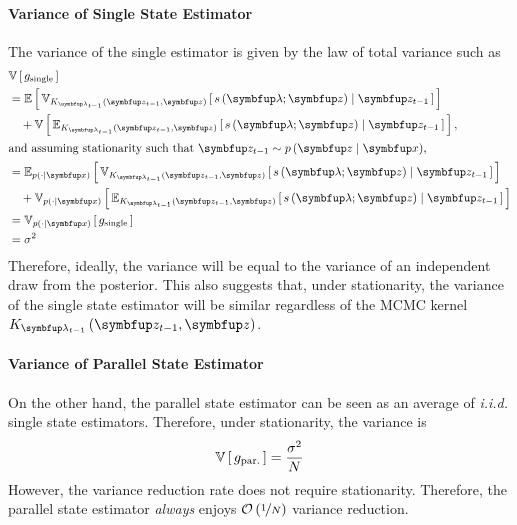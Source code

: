 \paragraph{Variance of Single State Estimator}
The variance of the single estimator is given by the law of total variance such as
\begin{align}
  &\V{g_{\text{single}}} \nonumber \\
  &= \E{ \Vsub{K_{\vlambda_{t-1}}\left(\vz_{t-1}, \vz\right)}{ s\left(\vlambda; \vz\right) \mid \vz_{t-1} }} \nonumber \\
  &\quad + \V{ \Esub{K_{\vlambda_{t-1}}\left(\vz_{t-1}, \vz\right)}{ s\left(\vlambda; \vz\right) \mid \vz_{t-1} } }, \\
  \intertext{and assuming stationarity such that \(\vz_{t-1} \sim p\left(\vz \mid \vx\right)\),}
  &= \Esub{p\left(\cdot \mid\vx \right)}{ \Vsub{K_{\vlambda_{t-1}}\left(\vz_{t-1}, \vz\right)}{ s\left(\vlambda; \vz\right) \mid \vz_{t-1} }} \nonumber\\
  &\quad + \Vsub{p\left(\cdot \mid\vx \right)}{ \Esub{K_{\vlambda_{t-1}}\left(\vz_{t-1}, \vz\right)}{ s\left(\vlambda; \vz\right) \mid \vz_{t-1} } } \\
  &= \Vsub{p\left(\cdot\mid\vx \right)}{g_{\text{single}}} \\
  &= \sigma^2
\end{align}
Therefore, ideally, the variance will be equal to the variance of an independent draw from the posterior.
This also suggests that, under stationarity, the variance of the single state estimator will be similar regardless of the MCMC kernel \(K_{\vlambda_{t-1}}\left(\vz_{t-1}, \vz\right)\).

\paragraph{Variance of Parallel State Estimator}
On the other hand, the parallel state estimator can be seen as an average of \textit{i.i.d.} single state estimators.
Therefore, under stationarity, the variance is
\begin{align}
  \mathbb{V}\left[\,g_{\text{par.}}\,\right] = \frac{\sigma^2}{N}
\end{align}
However, the variance reduction rate does not require stationarity.
Therefore, the parallel state estimator \textit{always} enjoys \(\mathcal{O}\left(\nicefrac{1}{N}\right)\) variance reduction.


